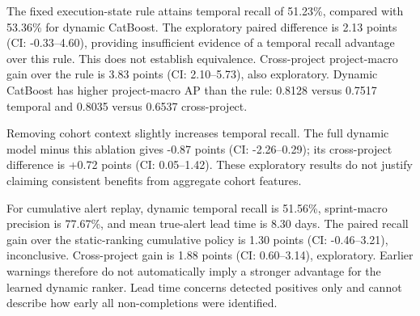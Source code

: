 The fixed execution-state rule attains temporal recall of 51.23\%, compared with 53.36\% for dynamic CatBoost. The exploratory paired difference is 2.13 points (CI: -0.33--4.60), providing insufficient evidence of a temporal recall advantage over this rule. This does not establish equivalence. Cross-project project-macro gain over the rule is 3.83 points (CI: 2.10--5.73), also exploratory. Dynamic CatBoost has higher project-macro AP than the rule: 0.8128 versus 0.7517 temporal and 0.8035 versus 0.6537 cross-project.

Removing cohort context slightly increases temporal recall. The full dynamic model minus this ablation gives -0.87 points (CI: -2.26--0.29); its cross-project difference is +0.72 points (CI: 0.05--1.42). These exploratory results do not justify claiming consistent benefits from aggregate cohort features.

For cumulative alert replay, dynamic temporal recall is 51.56\%, sprint-macro precision is 77.67\%, and mean true-alert lead time is 8.30 days. The paired recall gain over the static-ranking cumulative policy is 1.30 points (CI: -0.46--3.21), inconclusive. Cross-project gain is 1.88 points (CI: 0.60--3.14), exploratory. Earlier warnings therefore do not automatically imply a stronger advantage for the learned dynamic ranker. Lead time concerns detected positives only and cannot describe how early all non-completions were identified.
